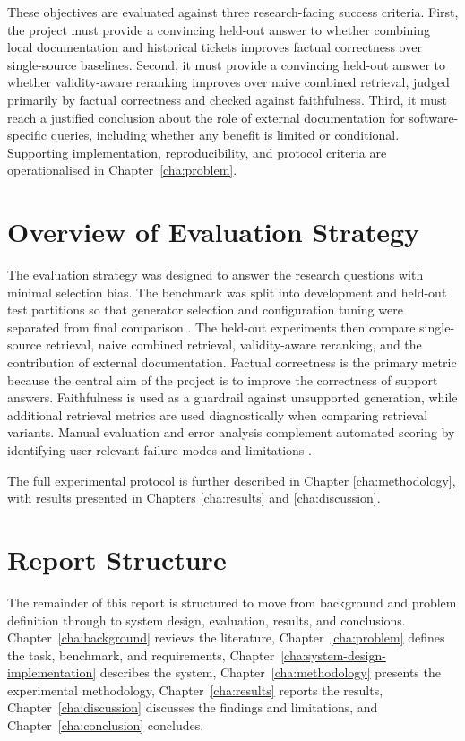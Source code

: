 These objectives are evaluated against three research-facing success criteria. First, the project must provide a convincing held-out answer to whether combining local documentation and historical tickets improves factual correctness over single-source baselines. Second, it must provide a convincing held-out answer to whether validity-aware reranking improves over naive combined retrieval, judged primarily by factual correctness and checked against faithfulness. Third, it must reach a justified conclusion about the role of external documentation for software-specific queries, including whether any benefit is limited or conditional. Supporting implementation, reproducibility, and protocol criteria are operationalised in Chapter~\ref{cha:problem}.

\section{Overview of Evaluation Strategy}
\label{sec:eval_overview}

The evaluation strategy was designed to answer the research questions with minimal selection bias. The benchmark was split into development and held-out test partitions so that generator selection and configuration tuning were separated from final comparison \citep{westphalImprovingModelSelection2019}. The held-out experiments then compare single-source retrieval, naive combined retrieval, validity-aware reranking, and the contribution of external documentation. Factual correctness is the primary metric because the central aim of the project is to improve the correctness of support answers. Faithfulness is used as a guardrail against unsupported generation, while additional retrieval metrics are used diagnostically when comparing retrieval variants. Manual evaluation and error analysis complement automated scoring by identifying user-relevant failure modes and limitations \citep{RAGAS,grittaHumanRankEvalAutomaticEvaluation2024,chenSurfaceMeasuringSelfPreference2025}.

The full experimental protocol is further described in Chapter \ref{cha:methodology}, with results presented in Chapters \ref{cha:results} and \ref{cha:discussion}. 

\section{Report Structure}
\label{sec:structure}

The remainder of this report is structured to move from background and problem definition through to system design, evaluation, results, and conclusions. Chapter~\ref{cha:background} reviews the literature, Chapter~\ref{cha:problem} defines the task, benchmark, and requirements, Chapter~\ref{cha:system-design-implementation} describes the system, Chapter~\ref{cha:methodology} presents the experimental methodology, Chapter~\ref{cha:results} reports the results, Chapter~\ref{cha:discussion} discusses the findings and limitations, and Chapter~\ref{cha:conclusion} concludes. 